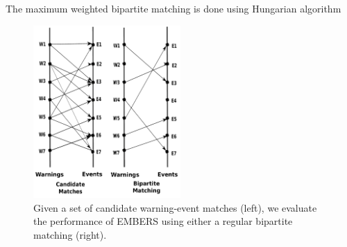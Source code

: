 The maximum weighted bipartite matching is done using Hungarian algorithm ~\cite{kuhn1955hungarian}
\begin{figure}[t]
\centering
\includegraphics[width=0.50\textwidth]{figures/matching.pdf}
\caption[An example of the bipartite matching used for evaluation]{Given a set of candidate warning-event matches (left), we evaluate the
performance of EMBERS using either a regular bipartite matching (right).}
\label{fig:matching}
\end{figure}

